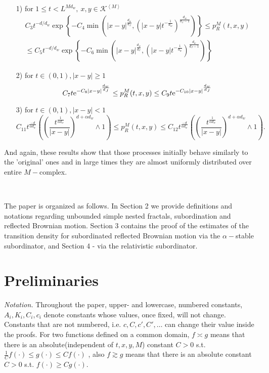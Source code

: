 \documentclass[11pt]{article}
\begin{document}
\begin{enumerate}
\item[1)] for $1 \leq t < L^{Md_w},  \ x,y \in \mathcal{K}^{\left\langle M \right\rangle}$
\begin{multline}
C_3t^{-d/d_w} \exp\left\{-C_4\min\left(|x-y|^{\frac{d_{w}}{d_{J}}},\left({|x-y|}{t^{-\frac{1}{d_w}}}\right)^{\frac{d_{w}}{d_{J}-1}}\right)\right\} \leq p^M_R(t,x,y)\\
 \leq C_5t^{-d/d_w} \exp\left\{-C_6\min\left(|x-y|^{\frac{d_{w}}{d_{J}}},\left({|x-y|}{t^{-\frac{1}{d_w}}}\right)^{\frac{d_{w}}{d_{J}-1}}\right)\right\}
\end{multline}
\item[2)] for $t \in (0,1), |x-y| \geq 1$
\begin{equation}
C_7t{\rm e}^{-C_8|x-y|^{\frac{d_{w}}{d_{J}}}} \leq p^M_R(t,x,y) \leq C_9t{\rm e}^{-C_{10}|x-y|^{\frac{d_{w}}{d_{J}}}}
\end{equation}
\item[3)] for $t \in (0,1), |x-y| < 1$
\begin{equation}
C_{11}t^{\frac{-d}{\alpha d_{w}}}\left(\left(\frac{t^{\frac{1}{\alpha d_{w}}}}{|x-y|}\right)^{d +\alpha d_{w}} \wedge 1\right) \leq p^M_R(t,x,y) \leq C_{12}
 t^{\frac{-d}{\alpha d_{w}}}\left(\left(\frac{t^{\frac{1}{\alpha d_{w}}}}{|x-y|}\right)^{d +\alpha d_{w}} \wedge 1\right).
\end{equation}
\end{enumerate}

And again, these results show that those processes initially behave similarly to the 'original' ones and in large times they are almost uniformly distributed over entire $M-$complex.

\

The paper is organized as follows.  In Section 2 we provide definitions and notations regarding  unbounded simple nested fractals, subordination and reflected Brownian motion. Section 3 contains the proof of the estimates of the transition density for subordinated reflected Brownian motion via the  $\alpha-$stable subordinator, and Section 4 - via the relativistic subordinator.


\section{Preliminaries}
{\em Notation.}  Throughout the paper,  upper- and lowercase, numbered constants, $A_i, K_i, C_{i},c_{i}$ denote constants whose values, once fixed, will not change. Constants that are not numbered, i.e. $c, C, c', C',\ldots$  can change their value inside the proofs.
For two functions defined on a common domain,
$f\asymp g$ means that there is an absolute(independent of $t,x,y,M$) constant $C>0$ s.t. $\frac{1}{C} f(\cdot)\leq g(\cdot )\leq Cf(\cdot)$ , also $f \gtrsim g$ means that there is an absolute constant $C>0$ s.t. $ f(\cdot) \geq Cg(\cdot ).$
\end{document}

